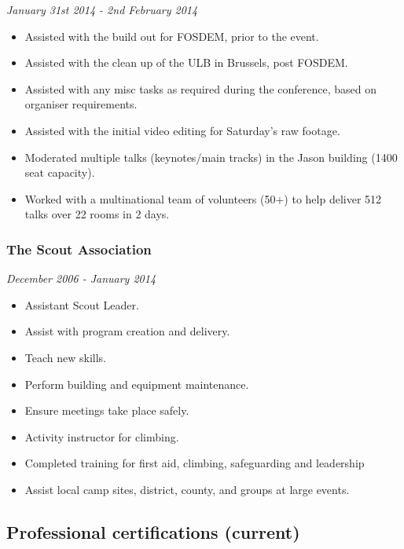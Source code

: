 \emph{January 31st 2014 - 2nd February 2014}

\begin{itemize}
\itemsep1pt\parskip0pt
\item
  Assisted with the build out for FOSDEM, prior to the event.
\item
  Assisted with the clean up of the ULB in Brussels, post FOSDEM.
\item
  Assisted with any misc tasks as required during the conference, based
  on organiser requirements.
\item
  Assisted with the initial video editing for Saturday's raw footage.
\item
  Moderated multiple talks (keynotes/main tracks) in the Jason building
  (1400 seat capacity).
\item
  Worked with a multinational team of volunteers (50+) to help deliver
  512 talks over 22 rooms in 2 days.
\end{itemize}

\subsubsection{The Scout Association}\label{the-scout-association}

\emph{December 2006 - January 2014}

\begin{itemize}
\itemsep1pt\parskip0pt
\item
  Assistant Scout Leader.
\item
  Assist with program creation and delivery.
\item
  Teach new skills.
\item
  Perform building and equipment maintenance.
\item
  Ensure meetings take place safely.
\item
  Activity instructor for climbing.
\item
  Completed training for first aid, climbing, safeguarding and
  leadership
\item
  Assist local camp sites, district, county, and groups at large events.
\end{itemize}

\subsection{Professional certifications
(current)}\label{professional-certifications-current}

